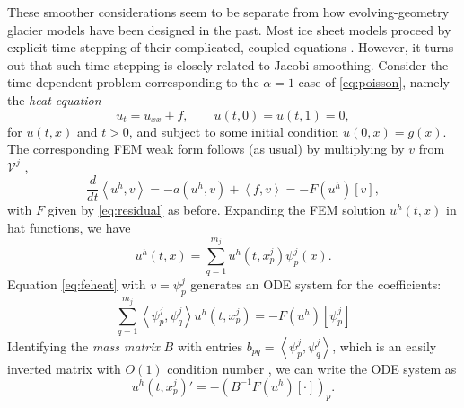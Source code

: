 \documentclass[letterpaper,final,12pt,reqno]{amsart}
\theoremstyle{claim}
\newcommand{\ip}[2]{\left<#1,#2\right>}
\numberwithin{equation}{section}
\numberwithin{figure}{section}
\numberwithin{table}{section}
\numberwithin{theorem}{section}
\begin{document}
These smoother considerations seem to be separate from how evolving-geometry glacier models have been designed in the past.  Most ice sheet models proceed by explicit time-stepping of their complicated, coupled equations \cite[for example]{Winkelmannetal2011}.  However, it turns out that such time-stepping is closely related to Jacobi smoothing.  Consider the time-dependent problem corresponding to the $\alpha=1$ case of \eqref{eq:poisson}, namely the \emph{heat equation}
\begin{equation}
u_t = u_{xx} + f, \qquad u(t,0)=u(t,1)=0, \label{eq:heat}
\end{equation}
for $u(t,x)$ and $t>0$, and subject to some initial condition $u(0,x)=g(x)$.  The corresponding FEM weak form follows (as usual) by multiplying by $v$ from $\mathcal{V}^j$ \cite[Chapter 8]{Johnson2009},
\begin{equation}
\frac{d}{dt}\ip{u^h}{v} = -a(u^h,v) + \ip{f}{v} = - F(u^h)[v], \label{eq:feheat}
\end{equation}
with $F$ given by \eqref{eq:residual} as before.  Expanding the FEM solution $u^h(t,x)$ in hat functions, we have
\begin{equation}
u^h(t,x) = \sum_{q=1}^{m_j} u^h(t,x_p^j) \psi_p^j(x). \label{eq:trialheat}
\end{equation}
Equation \eqref{eq:feheat} with $v=\psi_p^j$ generates an ODE system for the coefficients:
\begin{equation}
\sum_{q=1}^{m_j} \ip{\psi_p^j}{\psi_q^j} u^h(t,x_p^j) = - F(u^h)[\psi_p^j] \label{eq:odeheatearly}
\end{equation}
Identifying the \emph{mass matrix} $B$ with entries $b_{pq} = \ip{\psi_p^j}{\psi_q^j}$, which is an easily inverted matrix with $O(1)$ condition number \cite{Elmanetal2014}, we can write the ODE system as
\begin{equation}
u^h(t,x_p^j)' = - (B^{-1} F(u^h)[\cdot])_p. \label{eq:odeheat}
\end{equation}
\end{document}

